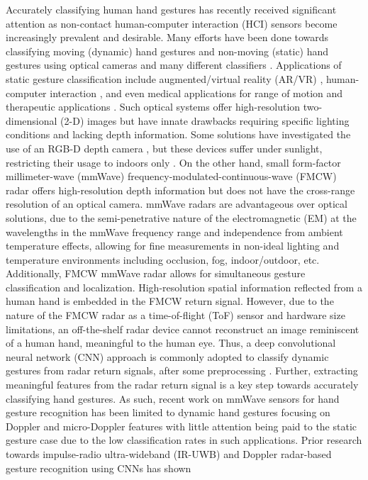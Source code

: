 \documentclass{ieeeaccess}
\begin{document}
Accurately classifying human hand gestures has recently received significant attention as non-contact human-computer interaction (HCI) sensors become increasingly prevalent and desirable. Many efforts have been done towards classifying moving (dynamic) hand gestures and non-moving (static) hand gestures using optical cameras and many different classifiers \cite{hand_pose_classification:comparison_of_classifiers}. Applications of static gesture classification include augmented/virtual reality (AR/VR) \cite{hand_pose_classification:depth_sensor_bad_sunlight}, human-computer interaction \cite{hand_pose_classification:OUHANDS_database}, and even medical applications for range of motion and therapeutic applications \cite{hand_pose_classification:medical}. Such optical systems offer high-resolution two-dimensional (2-D) images but have innate drawbacks requiring specific lighting conditions and lacking depth information. Some solutions have investigated the use of an RGB-D depth camera \cite{hand_pose_classification:depth_RGBD_camera}, but these devices suffer under sunlight, restricting their usage to indoors only \cite{hand_pose_classification:depth_sensor_bad_sunlight}. On the other hand, small form-factor millimeter-wave (mmWave) frequency-modulated-continuous-wave (FMCW) radar offers high-resolution depth information but does not have the cross-range resolution of an optical camera. mmWave radars are advantageous over optical solutions, due to the semi-penetrative nature of the electromagnetic (EM) at the wavelengths in the mmWave frequency range and independence from ambient temperature effects, allowing for fine measurements in non-ideal lighting and temperature environments including occlusion, fog, indoor/outdoor, etc. Additionally, FMCW mmWave radar allows for simultaneous gesture classification and localization. High-resolution spatial information reflected from a human hand is embedded in the FMCW return signal. However, due to the nature of the FMCW radar as a time-of-flight (ToF) sensor and hardware size limitations, an off-the-shelf radar device cannot reconstruct an image reminiscent of a human hand, meaningful to the human eye. Thus, a deep convolutional neural network (CNN) approach is commonly adopted to classify dynamic gestures from radar return signals, after some preprocessing \cite{dynamic_gesture_recognition:application_of_Dopper_DCNN}. Further, extracting meaningful features from the radar return signal is a key step towards accurately classifying hand gestures. As such, recent work on mmWave sensors for hand gesture recognition has been limited to dynamic hand gestures focusing on Doppler and micro-Doppler features \cite{dynamic_gesture_recognition:low_power,dynamic_gesture_recognition:LSTM,dynamic_gesture_recognition:micro_doppler,dynamic_gesture_recognition:svm} with little attention being paid to the static gesture case \cite{static_gesture_recognition:time_domain} due to the low classification rates in such applications. Prior research towards impulse-radio ultra-wideband (IR-UWB) \cite{ir-uwb:digit_writing,ir-uwb:dynamic_gesture,static_gesture_recognition:time_domain} and Doppler radar-based gesture recognition \cite{dynamic_gesture_recognition:low_power,dynamic_gesture_recognition:LSTM,dynamic_gesture_recognition:micro_doppler} using CNNs has shown 
\end{document}
